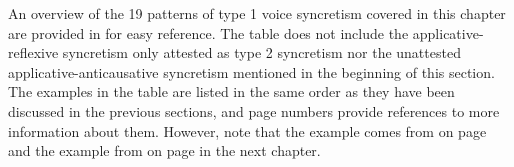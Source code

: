 An overview of the 19 patterns of type 1 voice syncretism covered in this chapter are provided in  for easy reference. The table does not include the applicative-reflexive syncretism only attested as type 2 syncretism nor the unattested applicative-anticausative syncretism mentioned in the beginning of this section. The examples in the table are listed in the same order as they have been discussed in the previous sections, and page numbers provide references to more information about them. However, note that the  example  comes from  on page \pageref{tab:ch5:antp-refl-recp-antc} and the  example  from  on page \pageref{tab:ch5:caus-pass-refl-recp} in the next chapter.

